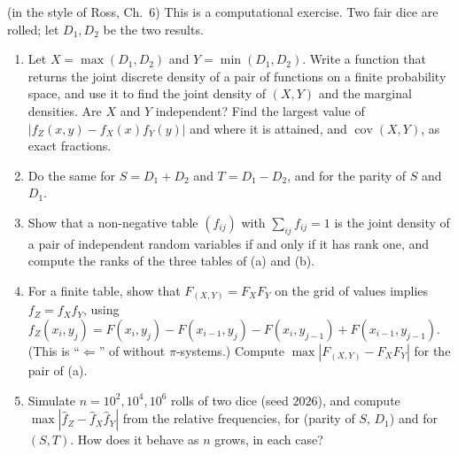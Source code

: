 \begin{exercise}\label{ex:pm-dice}
\medium (in the style of Ross, Ch.~6) This is a computational exercise. Two fair dice are
rolled; let $D_1,D_2$ be the two results.
\begin{enumerate}[label=(\alph*)]
  \item Let $X=\max(D_1,D_2)$ and $Y=\min(D_1,D_2)$. Write a function that returns the joint
    discrete density of a pair of functions on a finite probability space, and use it to find
    the joint density of $(X,Y)$ and the marginal densities. Are $X$ and $Y$ independent? Find
    the largest value of $|f_Z(x,y)-f_X(x)f_Y(y)|$ and where it is attained, and
    $\operatorname{cov}(X,Y)$, as exact fractions.
  \item Do the same for $S=D_1+D_2$ and $T=D_1-D_2$, and for the parity of $S$ and $D_1$.
  \item Show that a non-negative table $(f_{ij})$ with $\sum_{ij}f_{ij}=1$ is the joint density
    of a pair of independent random variables if and only if it has rank one, and compute the
    ranks of the three tables of (a) and (b).
  \item For a finite table, show that $F_{(X,Y)}=F_XF_Y$ on the grid of values implies
    $f_Z=f_Xf_Y$, using $f_Z(x_i,y_j)=F(x_i,y_j)-F(x_{i-1},y_j)-F(x_i,y_{j-1})+F(x_{i-1},y_{j-1})$.
    (This is ``$\Leftarrow$'' of  without $\pi$-systems.) Compute $\max|F_{(X,Y)}-F_XF_Y|$ for the pair of (a).
  \item Simulate $n=10^2,10^4,10^6$ rolls of two dice (seed $2026$), and compute
    $\max|\hat f_Z-\hat f_X\hat f_Y|$ from the relative frequencies, for (parity of $S$, $D_1$)
    and for $(S,T)$. How does it behave as $n$ grows, in each case?
\end{enumerate}
\end{exercise}

